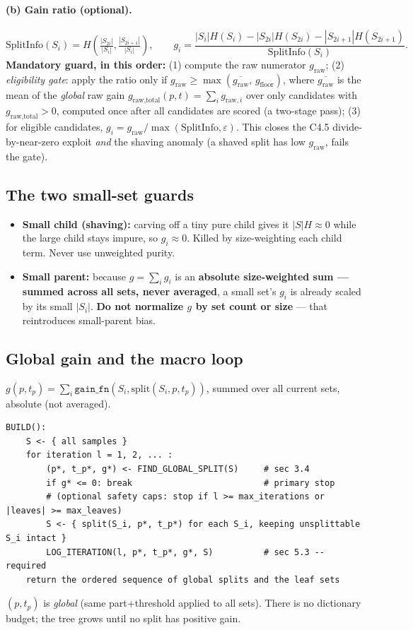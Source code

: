 \documentclass[11pt]{article}
\newcommand{\code}[1]{\texttt{#1}}
\newcommand{\gfn}{\code{gain\_fn}}
\begin{document}
\paragraph{(b) Gain ratio (optional).}
\[
\mathrm{SplitInfo}(S_i)=H\!\left(\tfrac{|S_{2i}|}{|S_i|},\tfrac{|S_{2i+1}|}{|S_i|}\right),\qquad
g_i=\frac{|S_i|H(S_i)-|S_{2i}|H(S_{2i})-|S_{2i+1}|H(S_{2i+1})}{\mathrm{SplitInfo}(S_i)}.
\]
\textbf{Mandatory guard, in this order:} (1) compute the raw numerator $g_{\text{raw}}$; (2) \emph{eligibility gate}: apply the ratio only if $g_{\text{raw}}\ge\max(\overline{g_{\text{raw}}},\,g_{\text{floor}})$, where $\overline{g_{\text{raw}}}$ is the mean of the \emph{global} raw gain $g_{\text{raw,total}}(p,t)=\sum_i g_{\text{raw},i}$ over only candidates with $g_{\text{raw,total}}>0$, computed once after all candidates are scored (a two-stage pass); (3) for eligible candidates, $g_i=g_{\text{raw}}/\max(\mathrm{SplitInfo},\varepsilon)$. This closes the C4.5 divide-by-near-zero exploit \emph{and} the shaving anomaly (a shaved split has low $g_{\text{raw}}$, fails the gate).


\subsection{The two small-set guards}
\begin{itemize}[nosep]
\item \textbf{Small child (shaving):} carving off a tiny pure child gives it $|S|H\approx0$ while the large child stays impure, so $g_i\approx0$. Killed by size-weighting each child term. Never use unweighted purity.
\item \textbf{Small parent:} because $g=\sum_i g_i$ is an \textbf{absolute size-weighted sum --- summed across all sets, never averaged}, a small set's $g_i$ is already scaled by its small $|S_i|$. \textbf{Do not normalize $g$ by set count or size} --- that reintroduces small-parent bias.
\end{itemize}


\subsection{Global gain and the macro loop}
$g(p,t_p)=\sum_i \gfn(S_i,\mathrm{split}(S_i,p,t_p))$, summed over all current sets, absolute (not averaged).

\begin{lstlisting}
BUILD():
    S <- { all samples }
    for iteration l = 1, 2, ... :
        (p*, t_p*, g*) <- FIND_GLOBAL_SPLIT(S)     # sec 3.4
        if g* <= 0: break                          # primary stop
        # (optional safety caps: stop if l >= max_iterations or |leaves| >= max_leaves)
        S <- { split(S_i, p*, t_p*) for each S_i, keeping unsplittable S_i intact }
        LOG_ITERATION(l, p*, t_p*, g*, S)          # sec 5.3 -- required
    return the ordered sequence of global splits and the leaf sets
\end{lstlisting}
$(p,t_p)$ is \emph{global} (same part+threshold applied to all sets). There is no dictionary budget; the tree grows until no split has positive gain.
\end{document}
